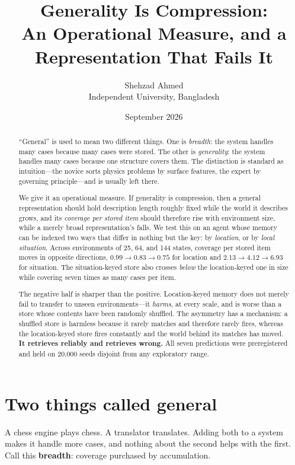 \documentclass[11pt]{article}
\title{\bfseries Generality Is Compression:\\
An Operational Measure, and a Representation That Fails It}
\author{Shehzad Ahmed\\\small Independent University, Bangladesh}
\date{September 2026}
\begin{document}
\maketitle

\begin{abstract}
\noindent
``General'' is used to mean two different things. One is \emph{breadth}: the
system handles many cases because many cases were stored. The other is
\emph{generality}: the system handles many cases because one structure covers
them. The distinction is standard as intuition---the novice sorts physics
problems by surface features, the expert by governing principle---and is
usually left there.

We give it an operational measure. If generality is compression, then a general
representation should hold description length roughly fixed while the world it
describes grows, and its \emph{coverage per stored item} should therefore rise
with environment size, while a merely broad representation's falls. We test this
on an agent whose memory can be indexed two ways that differ in nothing but the
key: by \emph{location}, or by \emph{local situation}. Across environments of
25, 64, and 144 states, coverage per stored item moves in opposite directions,
$0.99 \to 0.83 \to 0.75$ for location and $2.13 \to 4.12 \to 6.93$ for
situation. The situation-keyed store also crosses \emph{below} the
location-keyed one in size while covering seven times as many cases per item.

The negative half is sharper than the positive. Location-keyed memory does not
merely fail to transfer to unseen environments---it \emph{harms}, at every
scale, and is worse than a store whose contents have been randomly shuffled.
The asymmetry has a mechanism: a shuffled store is harmless because it rarely
matches and therefore rarely fires, whereas the location-keyed store fires
constantly and the world behind its matches has moved. \textbf{It retrieves
reliably and retrieves wrong.} All seven predictions were preregistered and
held on 20{,}000 seeds disjoint from any exploratory range.
\end{abstract}

\section{Two things called general}

A chess engine plays chess. A translator translates. Adding both to a system
makes it handle more cases, and nothing about the second helps with the first.
Call this \textbf{breadth}: coverage purchased by accumulation.
\end{document}
